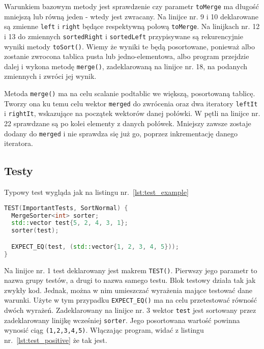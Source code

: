 Warunkiem bazowym metody jest sprawdzenie czy parametr \texttt{toMerge} ma długość mniejszą lub równą jeden - wtedy jest zwracany. Na linijce nr. 9 i 10 deklarowane są zmienne \texttt{left} i \texttt{right} będące respektywną połową \texttt{toMerge}. Na linijkach nr. 12 i 13 do zmiennych \texttt{sortedRight} i \texttt{sortedLeft} przypisywane są rekurencyjnie wyniki metody \texttt{toSort()}. Wiemy że wyniki te będą posortowane, ponieważ albo zostanie zwrocona tablica pusta lub jedno-elementowa, albo program przejdzie dalej i wykona metodę \texttt{merge()}, zadeklarowaną na linijce nr. 18, na podanych zmiennych i zwróci jej wynik.

Metoda \texttt{merge()} ma na celu scalanie podtablic we większą, posortowaną tablicę. Tworzy ona ku temu celu wektor \texttt{merged} do zwrócenia oraz dwa iteratory \texttt{leftIt} i \texttt{rightIt}, wskazujące na początek wektorów danej połówki. W pętli na linijce nr. 22 sprawdzane są po kolei elementy z danych połówek. Mniejszy zawsze zostaje dodany do \texttt{merged} i nie sprawdza się już go, poprzez inkrementację danego iteratora.


\subsection{Testy}

Typowy test wygląda jak na listingu nr.~\ref{lst:test_example}

\begin{lstlisting}[caption=Test frameworka Google Test, label={lst:test_example}, language=C++]
TEST(ImportantTests, SortNormal) {
  MergeSorter<int> sorter;
  std::vector test{5, 2, 4, 3, 1};
  sorter(test);

  EXPECT_EQ(test, (std::vector{1, 2, 3, 4, 5}));
}

\end{lstlisting}

Na linijce nr. 1 test deklarowany jest makrem \texttt{TEST()}. Pierwszy jego parametr to nazwa grupy testów, a drugi to nazwa samego testu. Blok testowy działa tak jak zwykły kod. Jednak, można w nim umieszczać wyrażenia mające testować dane warunki. Użyte w tym przypadku \texttt{EXPECT\_EQ()} ma na celu przetestować równość dwóch wyrażeń. Zadeklarowany na linijce nr. 3 wektor \texttt{test} jest sortowany przez zadeklarowany linijkę wcześniej \texttt{sorter}. Jego posortowana wartość powinna wynosić ciąg \texttt{(1,2,3,4,5)}. Włączając program, widać z listingu nr.~\ref{lst:test_positive} że tak jest.

